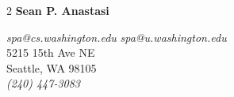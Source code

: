 \documentclass[9pt]{article}
\newenvironment{changemargin}[2]{%
  \begin{list}{}{%
    \setlength{\topsep}{0pt}%
    \setlength{\leftmargin}{#1}%
    \setlength{\rightmargin}{#2}%
    \setlength{\listparindent}{\parindent}%
    \setlength{\itemindent}{\parindent}%
    \setlength{\parsep}{\parskip}%
  }%
  \item[]}{\end{list}}
\begin{document}
  \begin{multicols}{2}
    {\huge{\textbf{Sean P. Anastasi}}}
    \begin{changemargin}{1cm}{0cm}
      \textit{spa@cs.washington.edu} \textit{spa@u.washington.edu} \\

      \hfill 5215 15th Ave NE \\
      \hfill Seattle, WA 98105 \\
      \hfill \textit{(240) 447-3083} \\
    \end{changemargin}
      
  \end{multicols}
  
\end{document}
